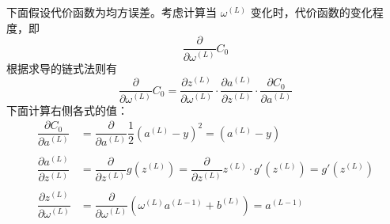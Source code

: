 下面假设代价函数为均方误差。考虑计算当 $\omega^{(L)}$ 变化时，代价函数的变化程度，即
\begin{equation}
    \dfrac{\partial}{\partial \omega^{(L)}} C_0
\end{equation}
根据求导的链式法则有
\begin{equation}
    \dfrac{\partial}{\partial \omega^{(L)}} C_0 = \dfrac{\partial z^{(L)}}{\partial \omega^{(L)}} 
    \cdot \dfrac{\partial a^{(L)}}{\partial z^{(L)}} \cdot \dfrac{\partial C_0}{\partial a^{(L)}}
\end{equation}
下面计算右侧各式的值：
\begin{equation}
    \begin{aligned}
        \dfrac{\partial C_0}{\partial a^{(L)}} &= \dfrac{\partial }{\partial a^{(L)}} \dfrac 12 \left(a^{(L)} - y\right)^2= \left(a^{(L)} - y\right) \\
        \\
        \dfrac{\partial a^{(L)}}{\partial z^{(L)}} &= \dfrac{\partial}{\partial z^{(L)}} g\left(z^{(L)}\right)= \dfrac{\partial}{\partial z^{(L)}} z^{(L)} \cdot g'\left(z^{(L)}\right) = g'\left(z^{(L)}\right) \\
        \\
        \dfrac{\partial z^{(L)}}{\partial \omega^{(L)}} &= \dfrac{\partial}{\partial \omega^{(L)}} \left(\omega^{(L)}a^{(L-1)} + b^{(L)}\right) = a^{(L-1)}
        \end{aligned}
\end{equation}

